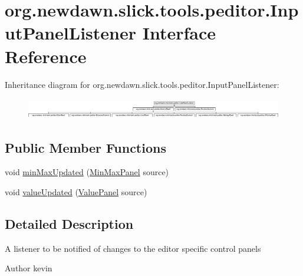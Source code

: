 \hypertarget{interfaceorg_1_1newdawn_1_1slick_1_1tools_1_1peditor_1_1_input_panel_listener}{}\section{org.\+newdawn.\+slick.\+tools.\+peditor.\+Input\+Panel\+Listener Interface Reference}
\label{interfaceorg_1_1newdawn_1_1slick_1_1tools_1_1peditor_1_1_input_panel_listener}
Inheritance diagram for org.\+newdawn.\+slick.\+tools.\+peditor.\+Input\+Panel\+Listener\+:\begin{figure}[H]
\begin{center}
\leavevmode
\includegraphics[height=0.915033cm]{interfaceorg_1_1newdawn_1_1slick_1_1tools_1_1peditor_1_1_input_panel_listener}
\end{center}
\end{figure}
\subsection*{Public Member Functions}
\begin{DoxyCompactItemize}
\item 
void \mbox{\hyperlink{interfaceorg_1_1newdawn_1_1slick_1_1tools_1_1peditor_1_1_input_panel_listener_a2f2fda874b026dd19ca947af14bc65c0}{min\+Max\+Updated}} (\mbox{\hyperlink{classorg_1_1newdawn_1_1slick_1_1tools_1_1peditor_1_1_min_max_panel}{Min\+Max\+Panel}} source)
\item 
void \mbox{\hyperlink{interfaceorg_1_1newdawn_1_1slick_1_1tools_1_1peditor_1_1_input_panel_listener_acd0102f73058e7c2e899297962b0fa11}{value\+Updated}} (\mbox{\hyperlink{classorg_1_1newdawn_1_1slick_1_1tools_1_1peditor_1_1_value_panel}{Value\+Panel}} source)
\end{DoxyCompactItemize}


\subsection{Detailed Description}
A listener to be notified of changes to the editor specific control panels

\begin{DoxyAuthor}{Author}
kevin 
\end{DoxyAuthor}


